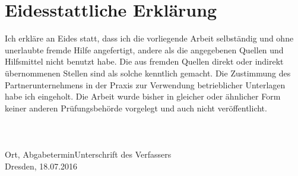 \thispagestyle{empty}
\section*{Eidesstattliche Erklärung }
\noindent
Ich erkläre an Eides statt, dass ich die vorliegende Arbeit selbständig und ohne unerlaubte fremde Hilfe angefertigt,  andere  als  die  angegebenen  Quellen  und  Hilfsmittel  nicht  benutzt habe. Die aus fremden Quellen direkt oder indirekt übernommenen Stellen sind als solche kenntlich gemacht. Die Zustimmung des Partnerunternehmens in der Praxis zur Verwendung betrieblicher Unterlagen habe ich eingeholt. Die Arbeit wurde bisher in gleicher oder ähnlicher Form keiner anderen  Prüfungsbehörde  vorgelegt  und  auch  nicht  veröffentlicht.
~\\
~\\
~\\
~\\


\noindent
Ort, Abgabetermin\hfill Unterschrift des Verfassers\\

\noindent
Dresden,  18.07.2016  